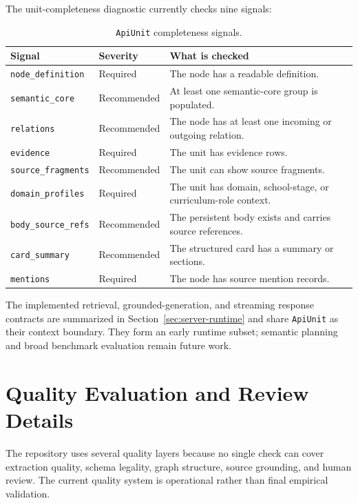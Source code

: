 \documentclass[11pt,letterpaper]{article}
\newcommand{\code}[1]{\nolinkurl{#1}}
\begin{document}
The unit-completeness diagnostic currently checks nine signals:

\begin{table}[H]
\centering
\small
\begin{tabularx}{\textwidth}{@{}p{}p{}Y@{}}
\toprule
Signal & Severity & What is checked\\
\midrule
\code{node_definition} & Required & The node has a readable definition.\\
\code{semantic_core} & Recommended & At least one semantic-core group is populated.\\
\code{relations} & Recommended & The node has at least one incoming or outgoing relation.\\
\code{evidence} & Required & The unit has evidence rows.\\
\code{source_fragments} & Recommended & The unit can show source fragments.\\
\code{domain_profiles} & Required & The unit has domain, school-stage, or curriculum-role context.\\
\code{body_source_refs} & Recommended & The persistent body exists and carries source references.\\
\code{card_summary} & Recommended & The structured card has a summary or sections.\\
\code{mentions} & Required & The node has source mention records.\\
\bottomrule
\end{tabularx}
\caption{\code{ApiUnit} completeness signals.}
\label{tab:apiunit-completeness}
\end{table}

The implemented retrieval, grounded-generation, and streaming response contracts are summarized in Section~\ref{sec:server-runtime} and share \code{ApiUnit} as their context boundary. They form an early runtime subset; semantic planning and broad benchmark evaluation remain future work.

\newpage

\section{Quality Evaluation and Review Details}
\label{app:quality-evaluation}

The repository uses several quality layers because no single check can cover extraction quality, schema legality, graph structure, source grounding, and human review. The current quality system is operational rather than final empirical validation.
\end{document}
